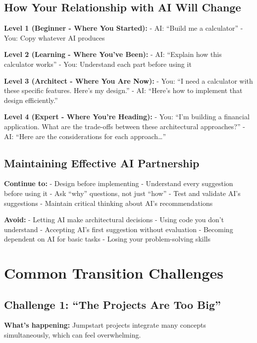 \documentclass[
  letterpaper,
  DIV=11,
  numbers=noendperiod,
  oneside]{scrreprt}
\begin{document}
\subsection{How Your Relationship with AI Will
Change}\label{how-your-relationship-with-ai-will-change}

\textbf{Level 1 (Beginner - Where You Started):} - AI: ``Build me a
calculator'' - You: Copy whatever AI produces

\textbf{Level 2 (Learning - Where You've Been):} - AI: ``Explain how
this calculator works'' - You: Understand each part before using it

\textbf{Level 3 (Architect - Where You Are Now):} - You: ``I need a
calculator with these specific features. Here's my design.'' - AI:
``Here's how to implement that design efficiently.''

\textbf{Level 4 (Expert - Where You're Heading):} - You: ``I'm building
a financial application. What are the trade-offs between these
architectural approaches?'' - AI: ``Here are the considerations for each
approach\ldots{}''

\subsection{Maintaining Effective AI
Partnership}\label{maintaining-effective-ai-partnership}

\textbf{Continue to:} - Design before implementing - Understand every
suggestion before using it - Ask ``why'' questions, not just ``how'' -
Test and validate AI's suggestions - Maintain critical thinking about
AI's recommendations

\textbf{Avoid:} - Letting AI make architectural decisions - Using code
you don't understand - Accepting AI's first suggestion without
evaluation - Becoming dependent on AI for basic tasks - Losing your
problem-solving skills

\section{Common Transition
Challenges}\label{common-transition-challenges}

\subsection{Challenge 1: ``The Projects Are Too
Big''}\label{challenge-1-the-projects-are-too-big}

\textbf{What's happening:} Jumpstart projects integrate many concepts
simultaneously, which can feel overwhelming.
\end{document}
